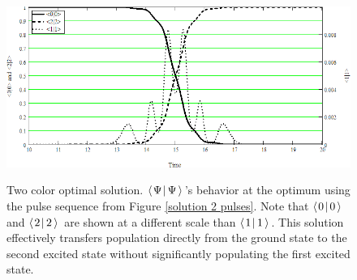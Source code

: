 \begin{figure}
\centering
\includegraphics[width=5.00in]
{solution_2_energy_levels/solution_2_energy_levels.png}\\
\caption[Two color optimal solution]{Two color optimal solution. $\left\langle \hspace{0.10em} \Psi \hspace{0.10em} \right| \Psi \left\rangle \right.$'s behavior at the optimum using the pulse sequence from Figure \ref{solution 2 pulses}. Note that $\left\langle \hspace{0.10em} 0 \hspace{0.10em} \right| 0 \left\rangle \right.$ and $\left\langle \hspace{0.10em} 2 \hspace{0.10em} \right| 2 \left\rangle \right.$ are shown at a different scale than $\left\langle \hspace{0.10em} 1 \hspace{0.10em} \right| 1 \left\rangle \right.$. This solution effectively transfers population directly from the ground state to the second excited state without significantly populating the first excited state.}
\label{solution 2 energy levels}
\end{figure} 

